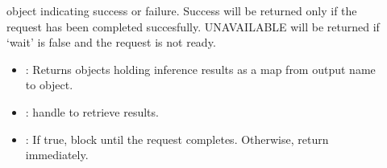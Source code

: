 \documentclass[letterpaper,10pt,english]{sphinxmanual}
\begin{document}
\begin{fulllineitems}
\begin{fulllineitems}
\begin{description}
\item[{}] \leavevmode
{\hyperref[\detokenize{cpp_api/classnvidia_1_1inferenceserver_1_1client_1_1Error:classnvidia_1_1inferenceserver_1_1client_1_1Error}]{}} object indicating success or failure. Success will be returned only if the request has been completed succesfully. UNAVAILABLE will be returned if ‘wait’ is false and the request is not ready. 

\item[{}] \leavevmode\begin{itemize}
\item {} 
: Returns {\hyperref[\detokenize{cpp_api/classnvidia_1_1inferenceserver_1_1client_1_1InferContext_1_1Result:classnvidia_1_1inferenceserver_1_1client_1_1InferContext_1_1Result}]{}} objects holding inference results as a map from output name to {\hyperref[\detokenize{cpp_api/classnvidia_1_1inferenceserver_1_1client_1_1InferContext_1_1Result:classnvidia_1_1inferenceserver_1_1client_1_1InferContext_1_1Result}]{}} object. 

\item {} 
: {\hyperref[\detokenize{cpp_api/classnvidia_1_1inferenceserver_1_1client_1_1InferContext_1_1Request:classnvidia_1_1inferenceserver_1_1client_1_1InferContext_1_1Request}]{}} handle to retrieve results. 

\item {} 
: If true, block until the request completes. Otherwise, return immediately. 

\end{itemize}

\end{description}


\end{fulllineitems}



\end{fulllineitems}
\end{document}
